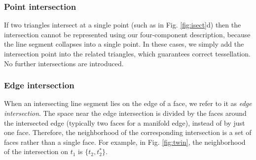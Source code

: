 \subsubsection{Point intersection}
\label{sec:ipoint}

If two triangles intersect at a single point (such as in Fig. \ref{fig:isect}d) then the intersection cannot be represented using our four-component description, because the line segment collapses into a single point. In these cases, we simply add the intersection point into the related triangles, which guarantees correct tessellation. No further intersections are introduced.

\subsubsection{Edge intersection}



When an intersecting line segment lies on the edge of a face, we refer to it as \emph{edge intersection}. The space near the edge intersection is divided by the faces around the intersected edge (typically two faces for a manifold edge), instead of by just one face. Therefore, the neighborhood of the corresponding intersection is a set of faces rather than a single face. For example, in Fig. \ref{fig:twin}, the neighborhood of the intersection on $t_1$ is $\{t_2, t^*_2\}$.


